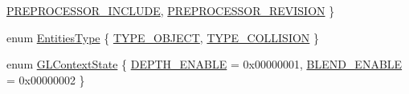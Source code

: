 \begin{DoxyCompactItemize}
\hyperlink{namespace_agmd_a50121d03589f8330ebe0b4ebfd175eb2a62690fe879b6c98c8ab38e2bddf7623b}{P\+R\+E\+P\+R\+O\+C\+E\+S\+S\+O\+R\+\_\+\+I\+N\+C\+L\+U\+D\+E}, 
\hyperlink{namespace_agmd_a50121d03589f8330ebe0b4ebfd175eb2a4d98ff03ec15fa89b2f89107c68cb63d}{P\+R\+E\+P\+R\+O\+C\+E\+S\+S\+O\+R\+\_\+\+R\+E\+V\+I\+S\+I\+O\+N}
 \}
\item 
enum \hyperlink{namespace_agmd_a48e386dda635142e369ff15442b2a6ea}{Entities\+Type} \{ \hyperlink{namespace_agmd_a48e386dda635142e369ff15442b2a6eaad2b04f2f90fefaf992c5d26aed9c8bb2}{T\+Y\+P\+E\+\_\+\+O\+B\+J\+E\+C\+T}, 
\hyperlink{namespace_agmd_a48e386dda635142e369ff15442b2a6eaa3b3e05f77776ad993fc844ce356a653e}{T\+Y\+P\+E\+\_\+\+C\+O\+L\+L\+I\+S\+I\+O\+N}
 \}
\item 
enum \hyperlink{namespace_agmd_a2ee7be36c1d3942266a1d90d26f9a2d3}{G\+L\+Context\+State} \{ \hyperlink{namespace_agmd_a2ee7be36c1d3942266a1d90d26f9a2d3a7b7dff9a63c3bd8a79ef43e085d3cdb7}{D\+E\+P\+T\+H\+\_\+\+E\+N\+A\+B\+L\+E} = 0x00000001, 
\hyperlink{namespace_agmd_a2ee7be36c1d3942266a1d90d26f9a2d3aa13328bbfd2b3be6ab100331fd656e9e}{B\+L\+E\+N\+D\+\_\+\+E\+N\+A\+B\+L\+E} = 0x00000002
 \}
\end{DoxyCompactItemize}
